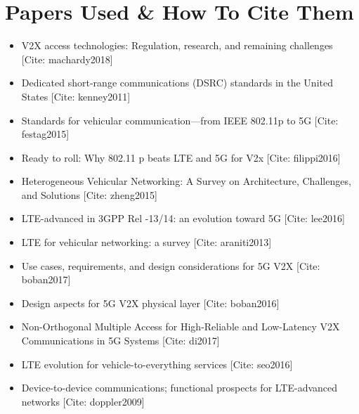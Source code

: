 \documentclass[conference,12pt,onecolumn]{IEEEtran}
\begin{document}
\section{Papers Used \& How To Cite Them}
\begin{itemize}
\item V2X access technologies: Regulation, research, and remaining challenges [Cite: machardy2018] \cite{machardy2018}
\item Dedicated short-range communications (DSRC) standards in the United States [Cite: kenney2011] \cite{kenney2011}
\item Standards for vehicular communication---from IEEE 802.11p to 5G [Cite: festag2015]\cite{festag2015}
\item Ready to roll: Why 802.11 p beats LTE and 5G for V2x [Cite: filippi2016] \cite{filippi2016}
\item Heterogeneous Vehicular Networking: A Survey on Architecture, Challenges, and Solutions [Cite: zheng2015] \cite{zheng2015}
\item LTE-advanced in 3GPP Rel -13/14: an evolution toward 5G [Cite: lee2016] \cite{lee2016}
\item LTE for vehicular networking: a survey [Cite: araniti2013] \cite{araniti2013}
\item Use cases, requirements, and design considerations for 5G V2X [Cite: boban2017] \cite{boban2017}
\item Design aspects for 5G V2X physical layer [Cite: boban2016] \cite{boban2016}
\item Non-Orthogonal Multiple Access for High-Reliable and Low-Latency V2X Communications in 5G Systems [Cite: di2017] \cite{di2017}
\item  LTE evolution for vehicle-to-everything services [Cite: seo2016] \cite{seo2016}
  \item Device-to-device communications; functional prospects for LTE-advanced networks [Cite: doppler2009] \cite{doppler2009}
  \end{itemize}
\end{document}
